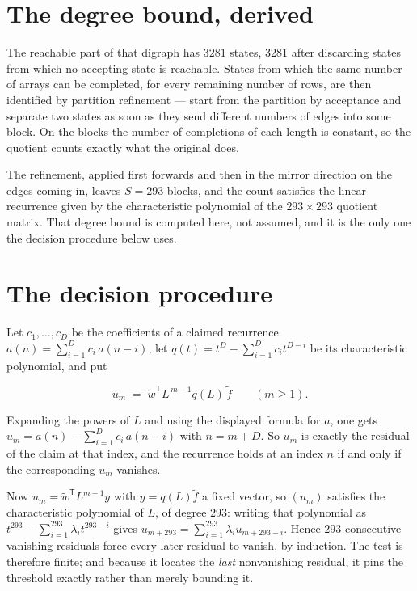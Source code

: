 \documentclass[11pt]{article}
\theoremstyle{definition}
\begin{document}
\section{The degree bound, derived}

The reachable part of that digraph has $3281$ states, $3281$ after discarding states from which no accepting state is reachable. States from which the same number of arrays can be completed, for every remaining number of rows, are then identified by partition refinement --- start from the partition by acceptance and separate two states as soon as they send different numbers of edges into some block. On the blocks the number of completions of each length is constant, so the quotient counts exactly what the original does.

The refinement, applied first forwards and then in the mirror direction on the edges coming in, leaves $S = 293$ blocks, and the count satisfies the linear recurrence given by the characteristic polynomial of the $293 \times 293$ quotient matrix. That degree bound is computed here, not assumed, and it is the only one the decision procedure below uses.

\section{The decision procedure}

Let $c_1,\dots,c_D$ be the coefficients of a claimed recurrence $a(n) = \sum_{i=1}^{D} c_i\,a(n-i)$, let $q(t) = t^{D} - \sum_{i=1}^{D} c_i t^{D-i}$ be its characteristic polynomial, and put

\[u_m \;=\; \tilde w^{\mathsf T} L^{\,m-1} q(L)\,\tilde f \qquad (m \ge 1).\]

Expanding the powers of $L$ and using the displayed formula for $a$, one gets $u_m = a(n) - \sum_{i=1}^{D} c_i\,a(n-i)$ with $n = m + D$. So $u_m$ is exactly the residual of the claim at that index, and the recurrence holds at an index $n$ if and only if the corresponding $u_m$ vanishes.

Now $u_m = \tilde w^{\mathsf T} L^{m-1} y$ with $y = q(L)\tilde f$ a fixed vector, so $(u_m)$ satisfies the characteristic polynomial of $L$, of degree $293$: writing that polynomial as $t^{293} - \sum_{i=1}^{293} \lambda_i t^{293-i}$ gives $u_{m+293} = \sum_{i=1}^{293} \lambda_i u_{m+293-i}$. Hence $293$ consecutive vanishing residuals force every later residual to vanish, by induction. The test is therefore finite; and because it locates the {\itshape last} nonvanishing residual, it pins the threshold exactly rather than merely bounding it.
\end{document}
